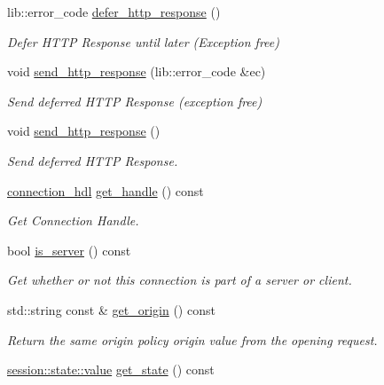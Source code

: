 \begin{DoxyCompactItemize}
lib\+::error\+\_\+code \hyperlink{classwebsocketpp_1_1connection_a32c3f964cef870faf0d8f23c5b7588bb}{defer\+\_\+http\+\_\+response} ()
\begin{DoxyCompactList}\small\item\em Defer H\+T\+T\+P Response until later (Exception free) \end{DoxyCompactList}\item 
void \hyperlink{classwebsocketpp_1_1connection_a6c192eb26aa8be9afed7ff9e85990ea8}{send\+\_\+http\+\_\+response} (lib\+::error\+\_\+code \&ec)
\begin{DoxyCompactList}\small\item\em Send deferred H\+T\+T\+P Response (exception free) \end{DoxyCompactList}\item 
void \hyperlink{classwebsocketpp_1_1connection_aabc8c4f01bb9fd6336e536d992ae1a4f}{send\+\_\+http\+\_\+response} ()
\begin{DoxyCompactList}\small\item\em Send deferred H\+T\+T\+P Response. \end{DoxyCompactList}\item 
\hyperlink{namespacewebsocketpp_a6b3d26a10ee7229b84b776786332631d}{connection\+\_\+hdl} \hyperlink{classwebsocketpp_1_1connection_a1b4ff357aedf82b1bcca23e47a1f1da7}{get\+\_\+handle} () const 
\begin{DoxyCompactList}\small\item\em Get Connection Handle. \end{DoxyCompactList}\item 
bool \hyperlink{classwebsocketpp_1_1connection_aef37e8da78fb29b36397b522e7b59cca}{is\+\_\+server} () const 
\begin{DoxyCompactList}\small\item\em Get whether or not this connection is part of a server or client. \end{DoxyCompactList}\item 
std\+::string const \& \hyperlink{classwebsocketpp_1_1connection_afa729fb7e0b72b175bdfe5edf5d86037}{get\+\_\+origin} () const 
\begin{DoxyCompactList}\small\item\em Return the same origin policy origin value from the opening request. \end{DoxyCompactList}\item 
\hyperlink{namespacewebsocketpp_1_1session_1_1state_a12acca56cdb6c10f467dfb10fc763ca5}{session\+::state\+::value} \hyperlink{classwebsocketpp_1_1connection_a3ca5ebd3cdbe115032d15117d79c23ca}{get\+\_\+state} () const 

\end{DoxyCompactItemize}
